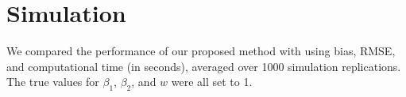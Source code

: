 \section{Simulation}
\label{sec:simulation}

% 


We compared the performance of our proposed method with  using bias, RMSE, and computational time (in seconds), averaged over 1000 simulation replications. The true values for $ \beta_1 $, $ \beta_2 $, and $ w $ were all set to 1.

